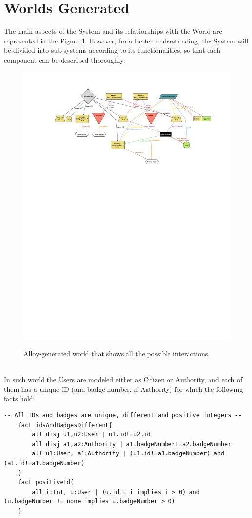 \documentclass{report}
\begin{document}
\section{Worlds Generated}
The main aspects of the System and its relationships with the World are represented in the Figure \ref{fig:all-oy}. However, for a better understanding, the System will be divided into sub-systems according to its functionalities, so that each component can be described thoroughly.
\begin{figure}[ht!]
	\begin{center}
	\includegraphics[width=\textwidth]{./img/Prova.pdf}
	\label{fig:all-oy}
	\caption{Alloy-generated world that shows all the possible interactions.}
	\end{center}
\end{figure}\\
In such world the Users are modeled either as Citizen or Authority, and each of them has a unique ID (and badge number, if Authority) for which the following facts hold:
\begin{lstlisting}[language=alloy]
	-- All IDs and badges are unique, different and positive integers --
	fact idsAndBadgesDifferent{
		all disj u1,u2:User | u1.id!=u2.id 
		all disj a1,a2:Authority | a1.badgeNumber!=a2.badgeNumber 
		all u1:User, a1:Authority | (u1.id!=a1.badgeNumber) and (a1.id!=a1.badgeNumber)
	}
	fact positiveId{
		all i:Int, u:User | (u.id = i implies i > 0) and (u.badgeNumber != none implies u.badgeNumber > 0)
	}
\end{lstlisting}
\end{document}
